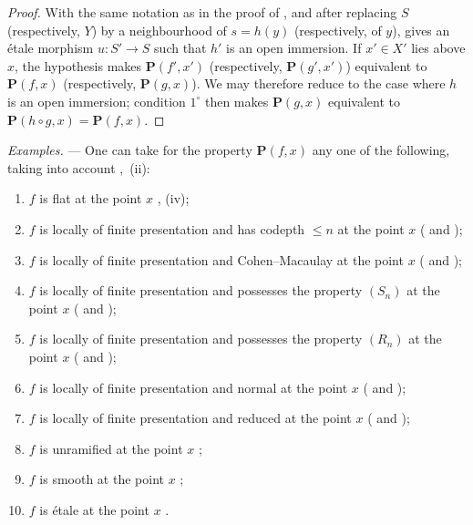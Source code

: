 \begin{proof}
With the same notation as in the proof of , and after replacing $S$ (respectively, $Y$) by a neighbourhood of $s=h(y)$ (respectively, of $y$),  gives an \'etale morphism $u:S'\to S$ such that $h'$ is an open immersion.
If $x'\in X'$ lies above $x$, the hypothesis makes $\mathbf{P}(f',x')$ (respectively, $\mathbf{P}(g',x')$) equivalent to $\mathbf{P}(f,x)$ (respectively, $\mathbf{P}(g,x)$).
We may therefore reduce to the case where $h$ is an open immersion; condition $1^\circ$ then makes $\mathbf{P}(g,x)$ equivalent to $\mathbf{P}(h\circ g,x)=\mathbf{P}(f,x)$.
\end{proof}

\begin{env}[18.4.11]
\label{IV.18.4.11}
\emph{Examples.} ---
One can take for the property $\mathbf{P}(f,x)$ any one of the following, taking into account ,~(ii):
\begin{enumerate}
  \item[(i)] $f$ is flat at the point $x$ , (iv);
  \item[(ii)] $f$ is locally of finite presentation and has codepth $\leq n$ at the point $x$ ( and );
  \item[(iii)] $f$ is locally of finite presentation and Cohen--Macaulay at the point $x$ ( and );
  \item[(iv)] $f$ is locally of finite presentation and possesses the property $(S_n)$ at the point $x$ ( and );
  \item[(v)] $f$ is locally of finite presentation and possesses the property $(R_n)$ at the point $x$ ( and );
  \item[(vi)] $f$ is locally of finite presentation and normal at the point $x$ ( and );
  \item[(vii)] $f$ is locally of finite presentation and reduced at the point $x$ ( and );
  \item[(viii)] $f$ is unramified at the point $x$ ;
  \item[(ix)] $f$ is smooth at the point $x$ ;
  \item[(x)] $f$ is \'etale at the point $x$ .
\end{enumerate}
\end{env}

